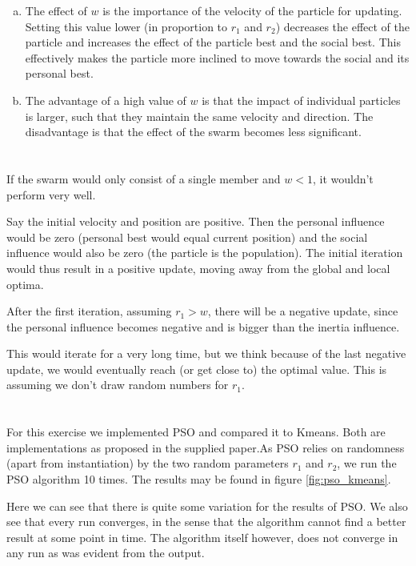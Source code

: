 \documentclass[11pt]{article}
\begin{document}
\begin{enumerate}[(a)]
\item The effect of $w$ is the importance of the velocity of the particle for updating. Setting this value lower (in proportion to $r_1$ and $r_2$) decreases the effect of the particle and increases the effect of the particle best and the social best. This effectively makes the particle more inclined to move towards the social and its personal best.

\item The advantage of a high value of $w$ is that the impact of individual particles is larger, such that they maintain the same velocity and direction. The disadvantage is that the effect of the swarm becomes less significant.
\end{enumerate}


\section{}
If the swarm would only consist of a single member and $w < 1$, it wouldn't perform very well. 

Say the initial velocity and position are positive. Then the personal influence would be zero (personal best would equal current position) and the social influence would also be zero (the particle is the population). The initial iteration would thus result in a positive update, moving away from the global and local optima. 

After the first iteration, assuming $r_1 > w$, there will be a negative update, since the personal influence becomes negative and is bigger than the inertia influence.

This would iterate for a very long time, but we think because of the last negative update, we would eventually reach (or get close to) the optimal value. This is assuming we don't draw random numbers for $r_1$.

\section{}
For this exercise we implemented PSO and compared it to Kmeans. Both are implementations as proposed in the supplied paper.As PSO relies on randomness (apart from instantiation) by the two random parameters $r_1$ and $r_2$, we run the PSO algorithm 10 times. The results may be found in figure \ref{fig:pso_kmeans}. 

Here we can see that there is quite some variation for the results of PSO. We also see that every run converges, in the sense that the algorithm cannot find a better result at some point in time. The algorithm itself however, does not converge in any run as was evident from the output.
\end{document}
